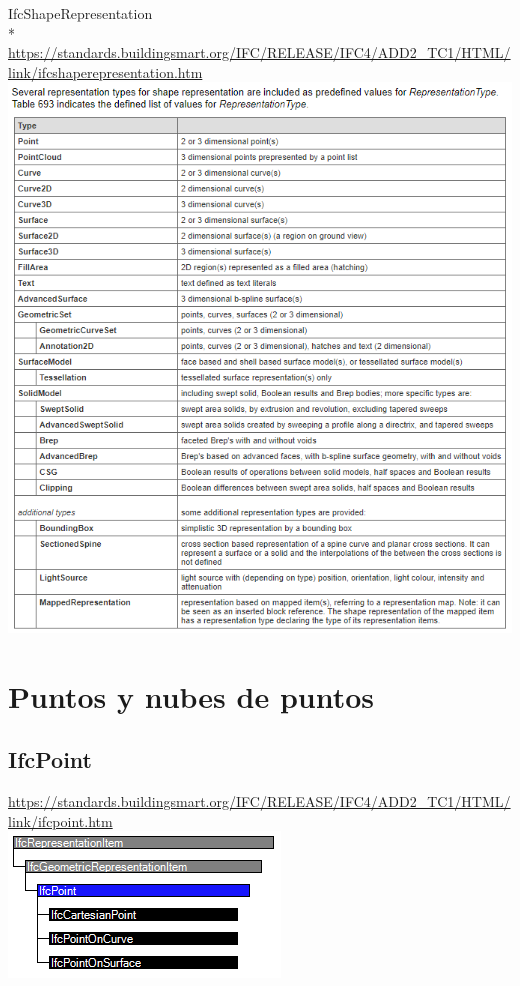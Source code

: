 \documentclass[spanish,12pt,a4paper,final,oneside]{book}
\begin{document}
\begin{minipage}{\textwidth}
IfcShapeRepresentation
\\* \url{https://standards.buildingsmart.org/IFC/RELEASE/IFC4/ADD2_TC1/HTML/link/ifcshaperepresentation.htm}
\\ \includegraphics[width=\textwidth]{RepresentationType}
\end{minipage}

\section{Puntos y nubes de puntos}

\subsection{IfcPoint} \label{puntos}
\url{https://standards.buildingsmart.org/IFC/RELEASE/IFC4/ADD2_TC1/HTML/link/ifcpoint.htm}
\\ \includegraphics[scale=1]{jerarquia de IfcPoint}
\end{document}
